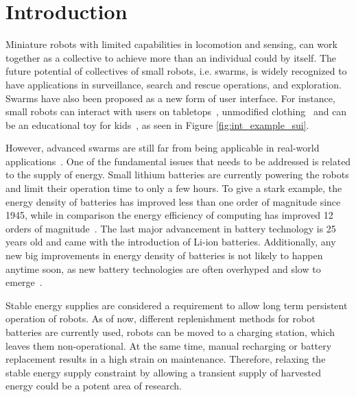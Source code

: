 \chapter{Introduction}
\label{chp:introduction}




Miniature robots with limited capabilities in locomotion and sensing, can work together as a collective to achieve more than an individual could by itself.
The future potential of collectives of small robots, i.e. swarms, is widely recognized to have applications in surveillance, search and rescue operations, and exploration.
Swarms have also been proposed as a new form of user interface.
For instance, small robots can interact with users on tabletops~\cite{legoc_uist_2016}, unmodified clothing~\cite{dementyev_uist_2016} and can be an educational toy for kids~\cite{sony_toio_2017}, as seen in Figure \ref{fig:int_example_sui}.


However, advanced swarms are still far from being applicable in real-world applications~\cite{barca_sekercioglu_2013}. 
One of the fundamental issues that needs to be addressed is related to the supply of energy.
Small lithium batteries are currently powering the robots and limit their operation time to only a few hours. 
To give a stark example, the energy density of batteries has improved less than one order of magnitude since 1945, while in comparison the energy efficiency of computing has improved 12 orders of magnitude~\cite{patel_pvc_2017}.
The last major advancement in battery technology is 25 years old and came with the introduction of Li-ion batteries.
Additionally, any new big improvements in energy density of batteries is not likely to happen anytime soon, as new battery technologies are often overhyped and slow to emerge~\cite{zachary_spec_2016}.



Stable energy supplies are considered a requirement to allow long term persistent operation of robots.
As of now, different replenishment methods for robot batteries are currently used, robots can be moved to a charging station, which leaves them non-operational.
At the same time, manual recharging or battery replacement results in a high strain on maintenance.
Therefore, relaxing the stable energy supply constraint by allowing a transient supply of harvested energy could be a potent area of research.

